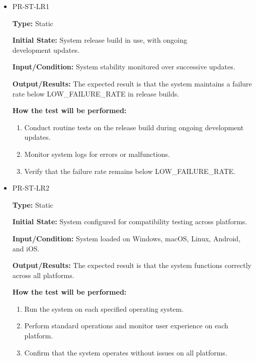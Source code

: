 \documentclass[12pt, titlepage]{article}
\begin{document}
\begin{itemize}
  \item PR-ST-LR1
  \begin{mdframed}[linewidth=0.5mm]
      \textbf{Type:} Static \par
      \textbf{Initial State:} System release build in use, with ongoing \\development updates. \par
      \textbf{Input/Condition:} System stability monitored over successive updates. \par
      \textbf{Output/Results:} The expected result is that the system maintains a failure rate below LOW\_FAILURE\_RATE in release builds. \par
      \textbf{How the test will be performed:}
      \begin{enumerate}[noitemsep]
        \item Conduct routine tests on the release build during ongoing development updates.
        \item Monitor system logs for errors or malfunctions.
        \item Verify that the failure rate remains below LOW\_FAILURE\_RATE.
      \end{enumerate}
  \end{mdframed}
  \item PR-ST-LR2
  \begin{mdframed}[linewidth=0.5mm]
      \textbf{Type:} Static \par
      \textbf{Initial State:} System configured for compatibility testing across platforms. \par
      \textbf{Input/Condition:} System loaded on Windows, macOS, Linux, Android, and iOS. \par
      \textbf{Output/Results:} The expected result is that the system functions correctly across all platforms. \par
      \textbf{How the test will be performed:}
      \begin{enumerate}[noitemsep]
        \item Run the system on each specified operating system.
        \item Perform standard operations and monitor user experience on each platform.
        \item Confirm that the system operates without issues on all platforms.
      \end{enumerate}
  \end{mdframed}
\end{itemize}
\end{document}
